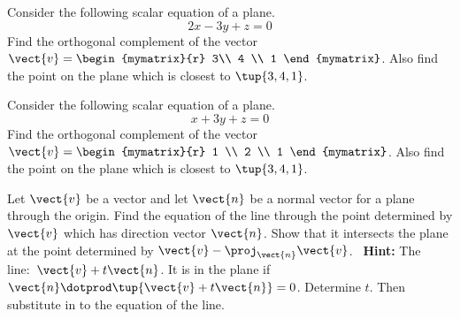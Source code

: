 \begin{enumialphparenastyle}

\begin{ex} Consider the following scalar equation of a plane. 
\begin{equation*}
2x-3y+z=0
\end{equation*}
Find the orthogonal complement of the vector $\vect{v}=\begin{mymatrix}{r}
3\\
4 \\
1
\end{mymatrix}$.
Also find the point on the plane which is closest to $\tup{3,4,1}$.
\end{ex}


\begin{ex} Consider the following scalar equation of a plane. 
\begin{equation*}
x+3y+z=0
\end{equation*}
Find the orthogonal complement of the vector $\vect{v}=\begin{mymatrix}{r}
 1 \\
2 \\
1
\end{mymatrix}$.
Also find the point on the plane which is closest to $\tup{3,4,1}$.
\end{ex}

\begin{ex} Let $\vect{v}$ be a vector and let $\vect{n}$ be a normal vector for a
plane through the origin. Find the equation of the line through the point
determined by $\vect{v}$ which has direction vector $\vect{n}$. Show that it
intersects the plane at the point determined by $\vect{v}-\proj_{\vect{n}
}\vect{v}$. \ \textbf{Hint: }The line:\ $\vect{v}+t\vect{n}$. It is in the
plane if $\vect{n}\dotprod \tup{\vect{v}+t\vect{n}} =0$. Determine $t$.
Then substitute in to the equation of the line.
\end{ex}


\end{enumialphparenastyle}
